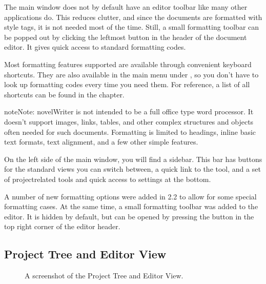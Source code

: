 \documentclass[a4paper,11pt,english]{sphinxmanual}
\begin{document}
\sphinxAtStartPar
The main window does not by default have an editor toolbar like many other applications do. This
reduces clutter, and since the documents are formatted with style tags, it is not needed most of
the time. Still, a small formatting toolbar can be popped out by clicking the left\sphinxhyphen{}most button in
the header of the document editor. It gives quick access to standard formatting codes.

\sphinxAtStartPar
Most formatting features supported are available through convenient keyboard shortcuts. They are
also available in the main menu under , so you don’t have to look up formatting codes
every time you need them. For reference, a list of all shortcuts can be found in the {\hyperref[\detokenize{usage_shortcuts:a-kb}]{}}
chapter.

\begin{sphinxadmonition}{note}{Note:}
\sphinxAtStartPar
novelWriter is not intended to be a full office type word processor. It doesn’t support images,
links, tables, and other complex structures and objects often needed for such documents.
Formatting is limited to headings, in\sphinxhyphen{}line basic text formats, text alignment, and a few other
simple features.
\end{sphinxadmonition}

\sphinxAtStartPar
On the left side of the main window, you will find a sidebar. This bar has buttons for the standard
views you can switch between, a quick link to the  tool, and a set of
project\sphinxhyphen{}related tools and quick access to settings at the bottom.

\sphinxAtStartPar
{}A number of new formatting options were added in 2.2 to allow for some special formatting cases.
At the same time, a small formatting toolbar was added to the editor. It is hidden by default,
but can be opened by pressing the button in the top right corner of the editor header.


\subsection{Project Tree and Editor View}
\label{\detokenize{usage_breakdown:project-tree-and-editor-view}}
\begin{figure}[htbp]
\centering
\capstart

\noindent{}
\caption{A screenshot of the Project Tree and Editor View.}\label{\detokenize{usage_breakdown:id1}}\end{figure}
\end{document}
